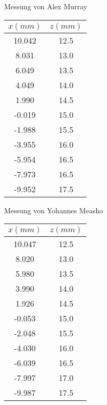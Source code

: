 \begin{center}
    \begin{threeparttable}
        \caption{Messung von Alex Murray}
        \begin{tabular}{cc}
            \toprule
            $x (mm)$ & $z (mm)$ \\
            \midrule
            10.042 & 12.5 \\
            8.031  & 13.0 \\
            6.049  & 13.5 \\
            4.049  & 14.0 \\
            1.990  & 14.5 \\
            -0.019 & 15.0 \\
            -1.988 & 15.5 \\
            -3.955 & 16.0 \\
            -5.954 & 16.5 \\
            -7.973 & 16.5 \\
            -9.952 & 17.5 \\
            \bottomrule
        \end{tabular}
    \end{threeparttable}
\end{center}

\begin{center}
    \begin{threeparttable}
        \caption{Messung von Yohannes Measho}
        \begin{tabular}{cc}
            \toprule
            $x (mm)$ & $z (mm)$ \\
            \midrule
            10.047 & 12.5 \\
            8.020  & 13.0 \\
            5.980  & 13.5 \\
            3.990  & 14.0 \\
            1.926  & 14.5 \\
            -0.053 & 15.0 \\
            -2.048 & 15.5 \\
            -4.030 & 16.0 \\
            -6.039 & 16.5 \\
            -7.997 & 17.0 \\
            -9.987 & 17.5 \\
           \bottomrule
        \end{tabular}
    \end{threeparttable}
\end{center}

